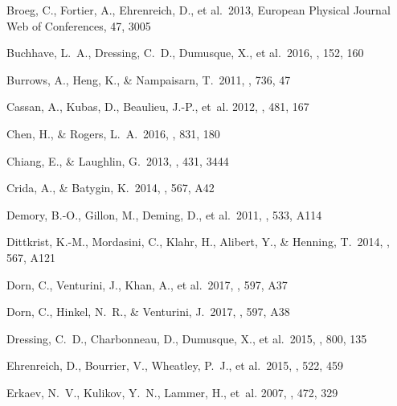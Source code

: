 \documentclass[]{emulateapj}
\begin{document}
\begin{thebibliography}{}
 Broeg, C., Fortier, A., 
Ehrenreich, D., et al.\ 2013, European Physical Journal Web of Conferences, 
47, 3005 

 Buchhave, L.~A., Dressing, C.~D., Dumusque, X., et al.\ 2016, \aj, 152, 160 


 Burrows, A., Heng, K., \& Nampaisarn, T.\ 2011, \apj, 736, 47 


{Cassan}, A., {Kubas}, D., {Beaulieu}, J.-P., {et~al.} 2012, \nat, 481, 167

 Chen, H., \& Rogers, L.~A.\ 2016, \apj, 831, 180 


 Chiang, E., \& Laughlin, G.\ 2013, \mnras, 431, 3444 

 Crida, A., \& Batygin, K.\ 2014, \aap, 567, A42 

 Demory, B.-O., Gillon, M., Deming, D., et al.\ 2011, \aap, 533, A114 

 Dittkrist, K.-M., Mordasini, C., Klahr, H., Alibert, Y., \& Henning, T.\ 2014, \aap, 567, A121 

 Dorn, C., Venturini, J., Khan, A., et al.\ 2017, \aap, 597, A37

 Dorn, C., Hinkel, N.~R., \& Venturini, J.\ 2017, \aap, 597, A38 

 Dressing, C.~D., Charbonneau, D., Dumusque, X., et al.\ 2015, \apj, 800, 135 


 Ehrenreich, D., Bourrier, V., Wheatley, P.~J., et al.\ 2015, \nat, 522, 459 

{Erkaev}, N.~V., {Kulikov}, Y.~N., {Lammer}, H., {et~al.} 2007, \aap, 472, 329


\end{thebibliography}
\end{document}
